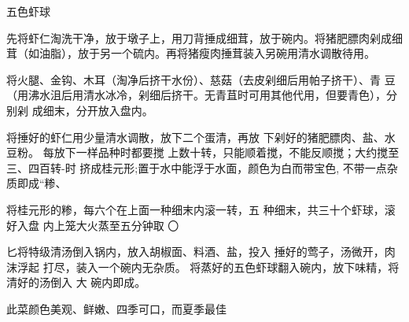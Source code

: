 \begin{recipe}{五色虾球}

\ingredients


\preparation

\step 先将虾仁淘洗干净，放于墩子上，用刀背捶成细茸，放于碗内。将猪肥膘肉剁成细
茸（如油脂），放于另一个硫内。再将猪瘦肉捶茸装入另碗用清水调散待用。

\step 将火腿、金钩、木耳（淘净后挤干水份）、慈菇（去皮剁细后用帕子挤干）、青
豆（用沸水沮后用清水冰冷，剁细后挤干。无青苴时可用其他代用，但要青色），分别剁
成细末，分开放入盘内。

将捶好的虾仁用少量清水调散，放下二个蛋清，再放 下剁好的猪肥膘肉、盐、水豆粉。
每放下一样品种时都要搅 上数十转，只能顺着搅，不能反顺搅；大约搅至三、四百转-时
挤成桂元形;置于水中能浮于水面，颜色为白而带宝色, 不带一点杂质即成“糁、

将桂元形的糁，每六个在上面一种细末内滚一转，五 种细末，共三十个虾球，滚好入盘
内上笼大火蒸至五分钟取 〇

匕将特级清汤倒入锅内，放入胡椒面、料酒、盐，投入 捶好的莺子，汤微开，肉沫浮起
打尽，装入一个碗内无杂质。 将蒸好的五色虾球翻入碗内，放下味精，将清好的汤倒入
大 碗内即成。

\features

此菜颜色美观、鲜嫩、四季可口，而夏季最佳

\end{recipe}

